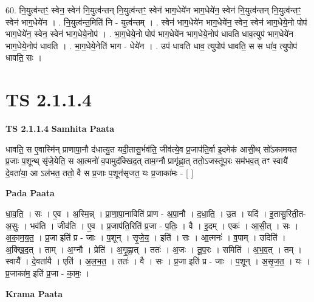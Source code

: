 \documentclass[17pt]{extarticle}
\begin{document}
60. नि॒युत्व॑न्तꣳ॒॒ स्वेन॒ स्वेन॑ नि॒युत्व॑न्तन् नि॒युत्व॑न्तꣳ॒॒ स्वेन॑ भाग॒धेये॑न भाग॒धेये॑न॒ स्वेन॑ नि॒युत्व॑न्तन् नि॒युत्व॑न्तꣳ॒॒ स्वेन॑ भाग॒धेये॑न । . नि॒युत्व॑न्त॒मिति॑ नि - युत्व॑न्तम् । . स्वेन॑ भाग॒धेये॑न भाग॒धेये॑न॒ स्वेन॒ स्वेन॑ भाग॒धेये॒नो पोप॑ भाग॒धेये॑न॒ स्वेन॒ स्वेन॑ भाग॒धेये॒नोप॑ । . भा॒ग॒धेये॒नो पोप॑ भाग॒धेये॑न भाग॒धेये॒नोप॑ धावति धाव॒त्युप॑ भाग॒धेये॑न भाग॒धेये॒नोप॑ धावति । . भा॒ग॒धेये॒नेति॑ भाग - धेये॑न । . उप॑ धावति धाव॒ त्युपोप॑ धावति॒ स स धा॑व॒ त्युपोप॑ धावति॒ सः । \newline
\pagebreak
{}
\section*{ TS 2.1.1.4 }

\textbf{TS 2.1.1.4 } \newline
\textbf{Samhita Paata} \newline

धावति॒ स ए॒वास्मि॑न् प्राणापा॒नौ द॑धात्यु॒त यदी॒तासु॒र्भव॑ति॒ जीव॑त्ये॒व प्र॒जाप॑ति॒र्वा इ॒दमेक॑ आसी॒थ् सो॑ऽकामयत प्र॒जाः प॒शून्थ् सृ॑जे॒येति॒ स आ॒त्मनो॑ व॒पामुद॑क्खिद॒त् ताम॒ग्नौ प्रागृ॑ह्णा॒त् ततो॒ऽजस्तू॑प॒रः सम॑भव॒त् तꣳ स्वायै॑ दे॒वता॑या॒ आ ऽल॑भत॒ ततो॒ वै स प्र॒जाः प॒शून॑सृजत॒ यः प्र॒जाका॑मः - [  ] \newline

\textbf{Pada Paata} \newline

धा॒व॒ति॒ । सः । ए॒व । अ॒स्मि॒न्न् । प्रा॒णा॒पा॒नाविति॑ प्राण - अ॒पा॒नौ । द॒धा॒ति॒ । उ॒त । यदि॑ । इ॒तासु॒रिती॒त-अ॒सुः॒ । भव॑ति । जीव॑ति । ए॒व । प्र॒जाप॑ति॒रिति॑ प्र॒जा - प॒तिः॒ । वै । इ॒दम् । एकः॑ । आ॒सी॒त् । सः । अ॒का॒म॒य॒त॒ । प्र॒जा इति॑ प्र - जाः । प॒शून् । सृ॒जे॒य॒ । इति॑ । सः । आ॒त्मनः॑ । व॒पाम् । उदिति॑ । अ॒क्खि॒द॒त् । ताम् । अ॒ग्नौ । प्रेति॑ । अ॒गृ॒ह्णा॒त् । ततः॑ । अ॒जः । तू॒प॒रः । समिति॑ । अ॒भ॒व॒त् । तम् । स्वायै᳚ । दे॒वता॑यै । एति॑ । अ॒ल॒भ॒त॒ । ततः॑ । वै । सः । प्र॒जा इति॑ प्र - जाः । प॒शून् । अ॒सृ॒ज॒त॒ । यः । प्र॒जाका॑म॒ इति॑ प्र॒जा - का॒मः॒ ।  \newline


\textbf{Krama Paata} \newline
\end{document}

